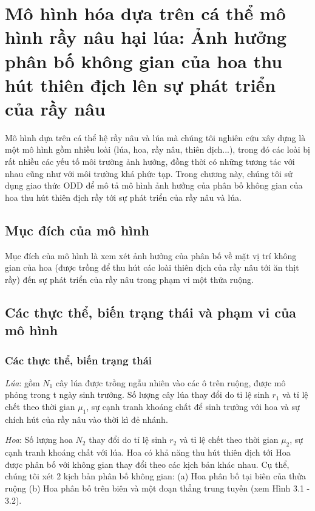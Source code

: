 \documentclass[13pt]{extreport}
\begin{document}
\chapter{Mô hình hóa dựa trên cá thể mô hình rầy nâu hại lúa: Ảnh hưởng phân bố không gian của hoa thu hút thiên địch lên sự phát triển của rầy nâu}
\indent Mô hình dựa trên cá thể hệ rầy nâu và lúa mà chúng tôi nghiên cứu xây dựng là một mô hình gồm nhiều loài (lúa, hoa, rầy nâu, thiên địch...), trong đó các loài bị rất nhiều các yếu tố môi trường ảnh hưởng, đồng thời có những tương tác với nhau cũng như với môi trường khá phức tạp. Trong chương này, chúng tôi sử dụng giao thức ODD để mô tả mô hình ảnh hưởng của phân bố không gian của hoa thu hút thiên địch rầy tới sự phát triển của rầy nâu và lúa.

\section{Mục đích của mô hình}
Mục đích của mô hình là xem xét ảnh hưởng của phân bố về mặt vị trí không gian của hoa (được trồng để thu hút các loài thiên địch của rầy nâu tới ăn thịt rầy) đến sự phát triển của rầy nâu trong phạm vi một thửa ruộng.

\section{Các thực thể, biến trạng thái và phạm vi của mô hình}
\subsection*{Các thực thể, biến trạng thái}
\textit{\indent Lúa}: gồm $N_1$ cây lúa được trồng ngẫu nhiên vào các ô trên ruộng, được mô phỏng trong t ngày sinh trưởng. Số lượng cây lúa thay đổi do tỉ lệ sinh $r_1$ và tỉ lệ chết theo thời gian  $\mu_1$, sự cạnh tranh khoáng chất để sinh trưởng với hoa và sự chích hút của rầy nâu vào thời kì đẻ nhánh.

\textit{Hoa}: Số lượng hoa $N_2$ thay đổi do tỉ lệ sinh $r_2$ và tỉ lệ chết theo thời gian  $\mu_2$, sự cạnh tranh khoáng chất với lúa. Hoa có khả năng thu hút thiên địch tới Hoa được phân bố với không gian thay đổi theo các kịch bản khác nhau. Cụ thể, chúng tôi xét 2 kịch bản phân bố không gian: (a) Hoa phân bố tại biên của thửa ruộng (b) Hoa phân bố trên biên và một đoạn thẳng trung tuyến (xem Hình 3.1 - 3.2).
\end{document}
